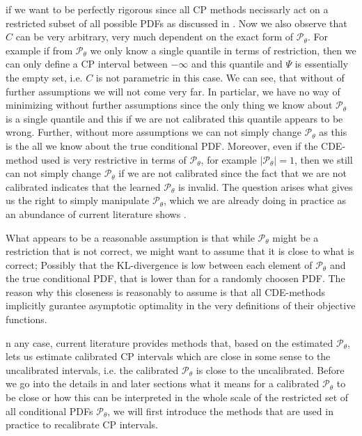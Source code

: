 if we want to be perfectly rigorous since all CP methods necissarly act on a restricted subset of all possible PDFs as discussed in . Now we also observe that $C$ can be very arbitrary, very much dependent on the exact form of $\mathcal{P}_{\theta}$. For example if from $\mathcal{P}_{\theta}$ we only know a single quantile in terms of restriction, then we can only define a CP interval between $- \infty$ and this quantile and $\Psi$ is essentially the empty set, i.e. $C$ is not parametric in this case. We can see, that without of further assumptions we will not come very far. In particlar, we have no way of minimizing  without further assumptions since the only thing we know about $\mathcal{P}_\theta$ is a single quantile and this if we are not calibrated this quantile appears to be wrong. Further, without more assumptions we can not simply change $\mathcal{P}_\theta$ as this is the all we know about the true conditional PDF. Moreover, even if the CDE-method used is very restrictive in terms of $\mathcal{P}_{\theta}$, for example $|\mathcal{P}_{\theta}|=1$, then we still can not simply change $\mathcal{P}_{\theta}$ if we are not calibrated since the fact that we are not calibrated indicates that the learned $\mathcal{P}_{\theta}$ is invalid. The question arises what gives us the right to simply manipulate $\mathcal{P}_{\theta}$, which we are already doing in practice as an abundance of current literature shows \cite{}.

What appears to be a reasonable assumption is that while $\mathcal{P}_{\theta}$ might be a restriction that is not correct, we might want to assume that it is close to what is correct; Possibly that the KL-divergence is low between each element of $\mathcal{P}_{\theta}$ and the true conditional PDF, that is lower than for a randomly choosen PDF. The reason why this closeness is reasonably to assume is that all CDE-methods implicitly gurantee asymptotic optimality in the very definitions of their objective functions.

n any case, current literature provides methods that, based on the estimated $\mathcal{P}_{\theta}$, lets us estimate calibrated CP intervals which are close in some sense to the uncalibrated intervals, i.e. the calibrated $\mathcal{P}_{\theta}$ is close to the uncalibrated. Before we go into the details in  and later sections what it means for a calibrated $\mathcal{P}_{\theta}$ to be close or how this can be interpreted in the whole scale of the restricted set of all conditional PDFs $\mathcal{P}_{\theta}$, we will first introduce the methods that are used in practice to recalibrate CP intervals.

